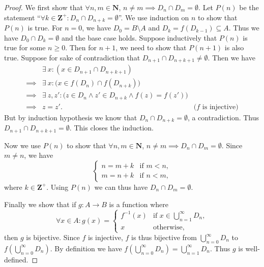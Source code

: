 \begin{proof}
    We first show that \(\forall n, m \in \mathbf{N}\), \(n \neq m \implies D_n \cap D_m = \emptyset\).
    Let \(P(n)\) be the statement ``\(\forall k \in \mathbf{Z}^+ : D_n \cap D_{n + k} = \emptyset\)''.
    We use induction on \(n\) to show that \(P(n)\) is true.
    For \(n = 0\), we have \(D_0 = B \setminus A\) and \(D_k = f(D_{k - 1}) \subseteq A\).
    Thus we have \(D_0 \cap D_k = \emptyset\) and the base case holds.
    Suppose inductively that \(P(n)\) is true for some \(n \geq 0\).
    Then for \(n + 1\), we need to show that \(P(n + 1)\) is also true.
    Suppose for sake of contradiction that \(D_{n + 1} \cap D_{n + k + 1} \neq \emptyset\).
    Then we have
    \begin{align*}
                 & \exists\ x : (x \in D_{n + 1} \cap D_{n + k + 1})                                                            \\
        \implies & \exists\ x : \big(x \in f(D_n) \cap f(D_{n + k})\big)                                                        \\
        \implies & \exists\ z, z' : \big(z \in D_n \land z' \in D_{n + k} \land f(z) = f(z')\big)                               \\
        \implies & z = z'.                                                                        & \text{(\(f\) is injective)}
    \end{align*}
    But by induction hypothesis we know that \(D_n \cap D_{n + k} = \emptyset\), a contradiction.
    Thus \(D_{n + 1} \cap D_{n + k + 1} = \emptyset\).
    This closes the induction.

    Now we use \(P(n)\) to show that \(\forall n, m \in \mathbf{N}\), \(n \neq m \implies D_n \cap D_m = \emptyset\).
    Since \(m \neq n\), we have
    \[
        \begin{cases}
            n = m + k & \text{if } m < n, \\
            m = n + k & \text{if } n < m,
        \end{cases}
    \]
    where \(k \in \mathbf{Z}^+\).
    Using \(P(n)\) we can thus have \(D_n \cap D_m = \emptyset\).

    Finally we show that if \(g : A \to B\) is a function where
    \[
        \forall x \in A : g(x) = \begin{cases}
            f^{-1}(x) & \text{if } x \in \bigcup_{n = 1}^\infty D_n, \\
            x         & \text{otherwise},
        \end{cases}
    \]
    then \(g\) is bijective.
    Since \(f\) is injective, \(f\) is thus bijective from \(\bigcup_{n = 0}^\infty D_n\) to \(f(\bigcup_{n = 0}^\infty D_n)\).
    By definition we have \(f(\bigcup_{n = 0}^\infty D_n) = \bigcup_{n = 1}^\infty D_n\).
    Thus \(g\) is well-defined.


\end{proof}
